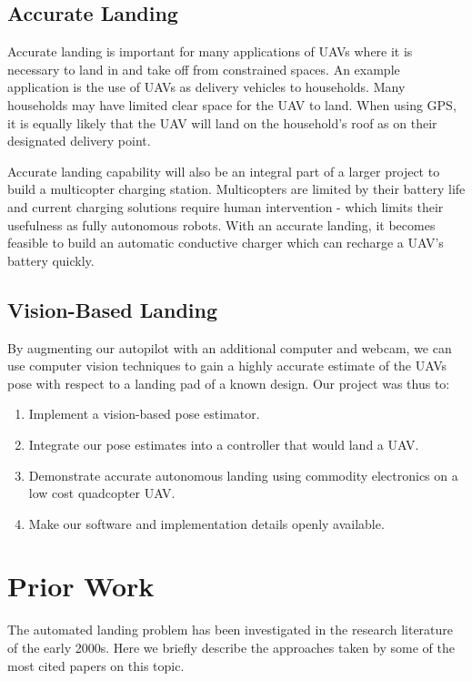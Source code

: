 \documentclass[10pt]{scrartcl} %
\begin{document}
\subsection{Accurate Landing}

Accurate landing is important for many applications of UAVs where it is necessary to land in and take off from constrained spaces. An example application is the use of UAVs as delivery vehicles to households. Many households may have limited clear space for the UAV to land. When using GPS, it is equally likely that the UAV will land on the household's roof as on their designated delivery point.

Accurate landing capability will also be an integral part of a larger project to build a multicopter charging station. Multicopters are limited by their battery life and current charging solutions require human intervention - which limits their usefulness as fully autonomous robots.  With an accurate landing, it becomes feasible to build an automatic conductive charger which can recharge a UAV's battery quickly.

\subsection{Vision-Based Landing}
By augmenting our autopilot with an additional computer and webcam, we can use computer vision techniques to gain a highly accurate estimate of the UAVs pose with respect to a landing pad of a known design.
Our project was thus to:
\begin{enumerate}
\item{Implement a vision-based pose estimator.}
\item{Integrate our pose estimates into a controller that would land a UAV.}
\item{Demonstrate accurate autonomous landing using commodity electronics on a low cost quadcopter UAV.}
\item{Make our software and implementation details openly available.}
\end{enumerate}

\section{Prior Work}

The automated landing problem has been investigated in the research literature
of the early 2000s. Here we briefly describe the approaches taken by some of
the most cited papers on this topic.
\end{document}
